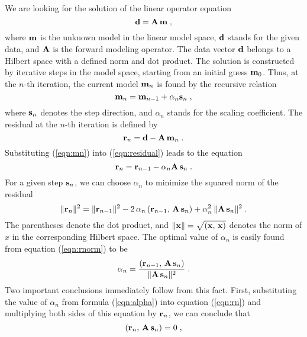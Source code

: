 We are looking for the solution of the linear operator equation
\begin{equation}
{\bf d = A\,m}\;,
\label{eqn:equation}
\end{equation} 
where ${\bf m}$ is the unknown model in the linear model space, ${\bf
d}$ stands for the given data, and ${\bf A}$ is the forward modeling
operator. The data vector ${\bf d}$ belongs to a Hilbert space with
a defined norm and dot product. The solution is constructed by iterative
steps in the model space, starting from an initial guess ${\bf
m}_0$. Thus, at the $n$-th iteration, the current model ${\bf m}_n$ is
found by the recursive relation
\begin{equation}
{\bf m}_n = {\bf m}_{n-1} + \alpha_n {\bf s}_n\;,
\label{eqn:mn}
\end{equation}
where ${\bf s}_n$ denotes the step direction, and $\alpha_n$ stands
for the scaling coefficient. The residual at the $n$-th iteration is
defined by
\begin{equation}
{\bf r}_n = {\bf d - A\,m}_{n}\;.
\label{eqn:residual}
\end{equation}
Substituting (\ref{eqn:mn}) into (\ref{eqn:residual}) leads to the equation
\begin{equation}
{\bf r}_n = {\bf r}_{n-1} - \alpha_n {\bf A\,s}_n\;.
\label{eqn:rn}
\end{equation}
For a given step ${\bf s}_n$, we can choose $\alpha_n$ to minimize the
squared norm of the residual
\begin{equation}
\|{\bf r}_n\|^2 = \|{\bf r}_{n-1}\|^2 - 
2\,\alpha_n \left({\bf r}_{n-1},\,{\bf A\,s}_n\right) +
\alpha_n^2\,\|{\bf A\,s}_n\|^2\;.
\label{eqn:rnorm}
\end{equation}
The parentheses denote the dot product, and 
$\|{\bf x}\|=\sqrt{({\bf x,\,x})}$ denotes the norm of $x$ in the
corresponding Hilbert space. The optimal value of $\alpha_n$ is easily
found from equation (\ref{eqn:rnorm}) to be
\begin{equation}
\alpha_n = {{\left({\bf r}_{n-1},\,{\bf A\,s}_n\right)} \over
{\|{\bf A\,s}_n\|^2}}\;.
\label{eqn:alpha}
\end{equation}
Two important conclusions immediately follow from this fact. First,
substituting the value of $\alpha_n$ from formula (\ref{eqn:alpha}) into
equation (\ref{eqn:rn}) and multiplying both sides of this equation by ${\bf
r}_n$, we can conclude that
\begin{equation}
\left({\bf r}_n,\,{\bf A\,s}_n\right) = 0\;,
\label{eqn:rasn}
\end{equation}
